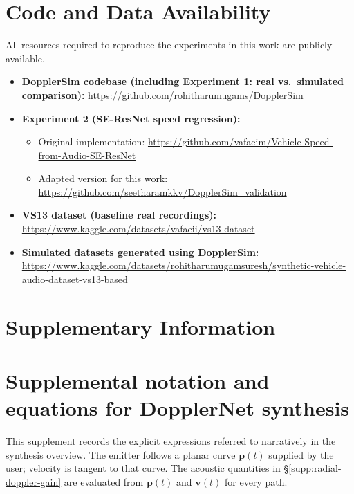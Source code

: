 \documentclass{article}
\begin{document}
\section{Code and Data Availability}
\label{sec:code-data}

All resources required to reproduce the experiments in this work are
publicly available.

\begin{itemize}
    \item \textbf{DopplerSim codebase (including Experiment 1: real vs.\ simulated comparison):} \url{https://github.com/rohitharumugams/DopplerSim}
  
  \item \textbf{Experiment 2 (SE-ResNet speed regression):}
  \begin{itemize}
    \item Original implementation: \url{https://github.com/vafaeim/Vehicle-Speed-from-Audio-SE-ResNet}
    \item Adapted version for this work: \url{https://github.com/seetharamkkv/DopplerSim_validation}
  \end{itemize}
  
  \item \textbf{VS13 dataset (baseline real recordings):} \url{https://www.kaggle.com/datasets/vafaeii/vs13-dataset}
  
  \item \textbf{Simulated datasets generated using DopplerSim:} \url{https://www.kaggle.com/datasets/rohitharumugamsuresh/synthetic-vehicle-audio-dataset-vs13-based}
\end{itemize}


\appendix
\section*{Supplementary Information}
\renewcommand{\thesection}{S.\arabic{section}}
\setcounter{section}{0}
\section{Supplemental notation and equations for DopplerNet synthesis}
\label{supp:sim-equations}

This supplement records the explicit expressions referred to narratively in the synthesis overview.
The emitter follows a planar curve $\mathbf{p}(t)$ supplied by the user; velocity is tangent to that curve.
The acoustic quantities in \S\ref{supp:radial-doppler-gain} are evaluated from $\mathbf{p}(t)$ and $\mathbf{v}(t)$ for every path.
\end{document}
